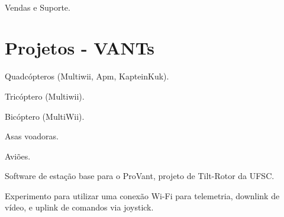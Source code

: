 \documentclass[A4]{deedy-resume} %
\begin{document}
\begin{minipage}[t]{0.66\textwidth} %




\\
\vspace{\topsep} %
\begin{tightitemize}
 \item Vendas e Suporte.
\end{tightitemize}
\vspace{\topsep} %

\section{Projetos - VANTs}

\descript{}
\begin{tightitemize}
 \item Quadcópteros (Multiwii, Apm, KapteinKuk).
 \item Tricóptero (Multiwii). 
 \item Bicóptero (MultiWii).
 \item Asas voadoras.
 \item Aviões.
\end{tightitemize}

\sectionspace %

\begin{tightitemize}
 \item Software de estação base para o ProVant, projeto de Tilt-Rotor da UFSC.
\end{tightitemize}

\sectionspace %

\begin{tightitemize}
 \item Experimento para utilizar uma conexão Wi-Fi para telemetria, downlink de vídeo, e uplink de comandos via joystick.
\end{tightitemize}


\end{minipage}
\end{document}
